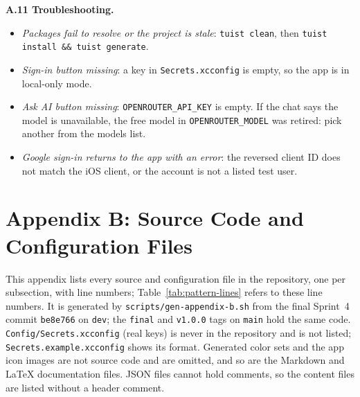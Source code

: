 \documentclass[12pt,letterpaper]{article}
\begin{document}
\textbf{A.11 Troubleshooting.}
\begin{itemize}
  \item \emph{Packages fail to resolve or the project is stale}: \texttt{tuist clean},
        then \texttt{tuist install \&\& tuist generate}.
  \item \emph{Sign-in button missing}: a key in \texttt{Secrets.xcconfig} is empty, so
        the app is in local-only mode.
  \item \emph{Ask AI button missing}: \texttt{OPENROUTER\_API\_KEY} is empty. If the
        chat says the model is unavailable, the free model in
        \texttt{OPENROUTER\_MODEL} was retired: pick another from the models list.
  \item \emph{Google sign-in returns to the app with an error}: the reversed client ID
        does not match the iOS client, or the account is not a listed test user.
\end{itemize}

\clearpage
\section*{Appendix B: Source Code and Configuration Files}\label{sec:appB}
This appendix lists every source and configuration file in the repository, one per
subsection, with line numbers; Table~\ref{tab:pattern-lines} refers to these line
numbers. It is generated by \texttt{scripts/gen-appendix-b.sh} from the final Sprint~4
commit \texttt{be8e766} on \texttt{dev}; the \texttt{final} and \texttt{v1.0.0} tags on \texttt{main} hold the same code. \texttt{Config/Secrets.xcconfig} (real keys) is never in the
repository and is not listed; \texttt{Secrets.example.xcconfig} shows its format.
Generated color sets and the app icon images are not source code and are omitted, and
so are the Markdown and \LaTeX{} documentation files. JSON files cannot hold comments,
so the content files are listed without a header comment.
\end{document}
